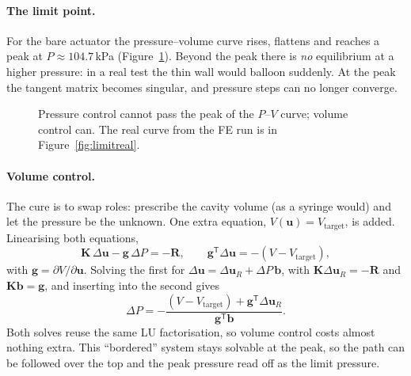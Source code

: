 \documentclass[11pt,a4paper]{article}
\numberwithin{equation}{section}
\newcommand{\uu}{\mathbf{u}}
\newcommand{\K}{\mathbf{K}}
\newcommand{\R}{\mathbf{R}}
\begin{document}
\paragraph{The limit point.}
For the bare actuator the pressure--volume curve rises, flattens and reaches a peak
at $P\approx104.7$\,kPa (Figure~\ref{fig:limit}). Beyond the peak there is
\emph{no} equilibrium at a higher pressure: in a real test the thin wall would
balloon suddenly. At the peak the tangent matrix becomes singular, and pressure
steps can no longer converge.

\begin{figure}[H]
\centering
{}
\caption{Pressure control cannot pass the peak of the $P$--$V$ curve; volume control
can. The real curve from the FE run is in Figure~\ref{fig:limitreal}.}
\label{fig:limit}
\end{figure}

\paragraph{Volume control.}
The cure is to swap roles: prescribe the cavity volume (as a syringe would) and let
the pressure be the unknown. One extra equation, $V(\uu)=V_{\text{target}}$, is added.
Linearising both equations,
\begin{equation}
\K\,\Delta\uu-\mathbf{g}\,\Delta P=-\R,\qquad \mathbf{g}^{\mathsf T}\Delta\uu=-(V-V_{\text{target}}),
\end{equation}
with $\mathbf{g}=\partial V/\partial\uu$. Solving the first for
$\Delta\uu=\Delta\uu_R+\Delta P\,\mathbf{b}$, with $\K\Delta\uu_R=-\R$ and
$\K\mathbf{b}=\mathbf{g}$, and inserting into the second gives
\begin{equation}
\Delta P=-\frac{(V-V_{\text{target}})+\mathbf{g}^{\mathsf T}\Delta\uu_R}{\mathbf{g}^{\mathsf T}\mathbf{b}} .
\end{equation}
Both solves reuse the same LU factorisation, so volume control costs almost nothing
extra. This ``bordered'' system stays solvable at the peak, so the path can be
followed over the top and the peak pressure read off as the limit pressure.
\end{document}
